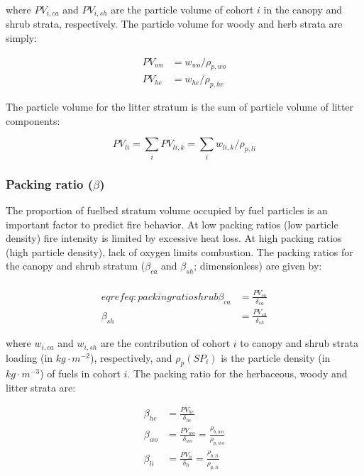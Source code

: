\documentclass[]{book}
\begin{document}
where \(PV_{i,ca}\) and \(PV_{i,sh}\) are the particle volume of cohort
\(i\) in the canopy and shrub strata, respectively. The particle volume
for woody and herb strata are simply:

\begin{eqnarray}
PV_{wo} &= w_{wo}/\rho_{p,wo}\\
PV_{he} &= w_{he}/\rho_{p,he}
\end{eqnarray}

The particle volume for the litter stratum is the sum of particle volume
of litter components:

\begin{equation}
PV_{li} = \sum_{i}{PV_{li,k}} = \sum_{i}{w_{li,k}/\rho_{p, li}}
\end{equation}

\subsubsection{\texorpdfstring{Packing ratio
(\(\beta\))}{Packing ratio (\textbackslash{}beta)}}\label{packing-ratio-beta}

The proportion of fuelbed stratum volume occupied by fuel particles is
an important factor to predict fire behavior. At low packing ratios (low
particle density) fire intensity is limited by excessive heat loss. At
high packing ratios (high particle density), lack of oxygen limits
combustion. The packing ratios for the canopy and shrub stratum
(\(\beta_{ca}\) and \(\beta_{sh}\); dimensionless) are given by:

\begin{eqnarray}\\eqref{eq:packingratioshrub}
\beta _{ca} &= \frac{PV_{ca}}{\delta_{ca}}\\
\beta _{sh} &= \frac{PV_{sh}}{\delta_{sh}}
\end{eqnarray}

where \(w_{i,ca}\) and \(w_{i,sh}\) are the contribution of cohort \(i\)
to canopy and shrub strata loading (in \(kg\cdot m^{-2}\)),
respectively, and \(\rho_p(SP_i)\) is the particle density (in
\(kg\cdot m^{-3}\)) of fuels in cohort \(i\). The packing ratio for the
herbaceous, woody and litter strata are:

\begin{eqnarray}
\beta _{he} &= \frac{PV_{he}}{\delta_{he}}\\
\beta _{wo} &= \frac{PV_{wo}}{\delta_{wo}}= \frac{\rho_{b,wo}}{\rho_{p,wo}}\\
\beta _{li} &= \frac{PV_{li}}{\delta_{li}}= \frac{\rho_{b,li}}{\rho_{p,li}}
\end{eqnarray}
\end{document}
